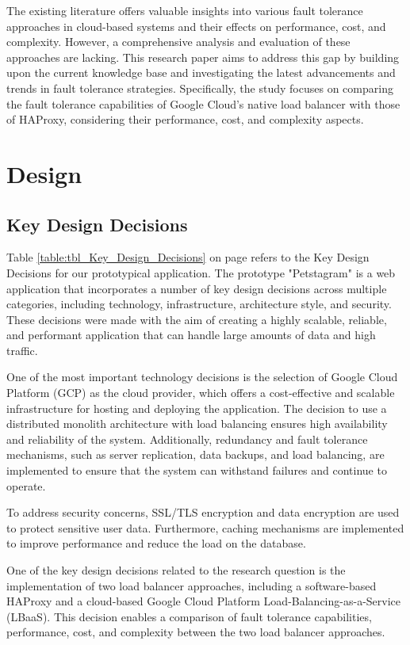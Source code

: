 \documentclass[lettersize,journal]{IEEEtran}
\begin{document}
The existing literature offers valuable insights into various fault tolerance approaches in cloud-based systems and their effects on performance, cost, and complexity. However, a comprehensive analysis and evaluation of these approaches are lacking. This research paper aims to address this gap by building upon the current knowledge base and investigating the latest advancements and trends in fault tolerance strategies. Specifically, the study focuses on comparing the fault tolerance capabilities of Google Cloud's native load balancer with those of HAProxy, considering their performance, cost, and complexity aspects.

\section{Design}
\subsection{Key Design Decisions}
\noindent
Table \ref{table:tbl_Key_Design_Decisions} on page \pageref{table:tbl_Key_Design_Decisions} refers to the Key Design Decisions for our prototypical application.
The prototype "Petstagram" is a web application that incorporates a number of key design decisions across multiple categories, including technology, infrastructure, architecture style, and security. These decisions were made with the aim of creating a highly scalable, reliable, and performant application that can handle large amounts of data and high traffic.

One of the most important technology decisions is the selection of Google Cloud Platform (GCP) as the cloud provider, which offers a cost-effective and scalable infrastructure for hosting and deploying the application. The decision to use a distributed monolith architecture with load balancing ensures high availability and reliability of the system. Additionally, redundancy and fault tolerance mechanisms, such as server replication, data backups, and load balancing, are implemented to ensure that the system can withstand failures and continue to operate.

To address security concerns, SSL/TLS encryption and data encryption are used to protect sensitive user data. Furthermore, caching mechanisms are implemented to improve performance and reduce the load on the database.

One of the key design decisions related to the research question is the implementation of two load balancer approaches, including a software-based HAProxy and a cloud-based Google Cloud Platform Load-Balancing-as-a-Service (LBaaS). This decision enables a comparison of fault tolerance capabilities, performance, cost, and complexity between the two load balancer approaches.
\end{document}
